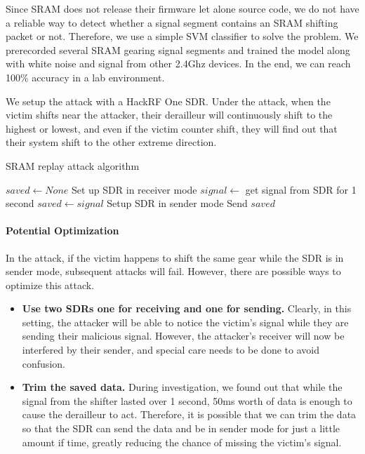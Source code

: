 \documentclass[letterpaper,twocolumn,10pt]{article}
\begin{document}
Since SRAM does not release their firmware let alone source code, we do not have a reliable way to detect whether a signal segment contains an SRAM shifting packet or not. Therefore, we use a simple SVM classifier to solve the problem. We prerecorded several SRAM gearing signal segments and trained the model along with white noise and signal from other 2.4Ghz devices. In the end, we can reach 100\% accuracy in a lab environment.

We setup the attack with a HackRF One SDR. Under the attack, when the victim shifts near the attacker, their derailleur will continuously shift to the highest or lowest, and even if the victim counter shift, they will find out that their system shift to the other extreme direction.
\begin{algorithm}
  \caption{SRAM replay attack algorithm}\label{alg:cap}
  \begin{algorithmic}[1]
    \State $saved \gets None$
    \State Set up SDR in receiver mode
    \State $signal \gets$ get signal from SDR for 1 second
    \State $saved \gets signal$
    \State Setup SDR in sender mode
    \State Send $saved$
    \EndIf
    \EndWhile
  \end{algorithmic}
\end{algorithm}

\paragraph{Potential Optimization}
In the attack, if the victim happens to shift the same gear while the SDR is in sender mode,
subsequent attacks will fail. However, there are possible ways to optimize this attack.
\begin{itemize}
  \item \textbf{Use two SDRs one for receiving and one for sending.} Clearly, in this setting, the attacker will be able to notice the victim's signal while they are sending their malicious signal. However, the attacker's receiver will now be interfered by their sender, and special care needs to be done to avoid confusion.
  \item \textbf{Trim the saved data.} During investigation, we found out that while the signal from the shifter lasted over 1 second, 50ms worth of data is enough to cause the derailleur to act. Therefore, it is possible that we can trim the data so that the SDR can send the data and be in sender mode for just a little amount if time, greatly reducing the chance of missing the victim's signal.
\end{itemize}
\end{document}

